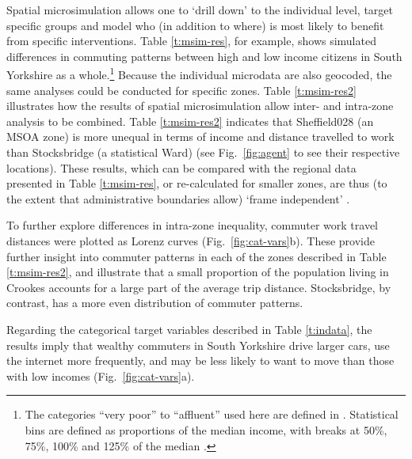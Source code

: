 \documentclass[a4paper, 11pt, twoside]{Thesis}
\begin{document}
Spatial microsimulation allows one to `drill down' to the individual
level, target specific groups and model who (in addition to where) is most
likely to benefit from specific interventions. Table \ref{t:msim-res}, for
example, shows simulated differences in commuting patterns between high
and low income citizens in South Yorkshire as a whole.\footnote{The categories
``very poor'' to ``affluent'' used here are defined in \citep{Ballas2005b}.
Statistical bins are defined as proportions of the median income, with
breaks at 50\%, 75\%, 100\% and 125\% of the median \citep[p.~91]{Ballas2005b}.}
Because the individual
microdata are also geocoded, the same analyses could be conducted for
specific zones.
Table \ref{t:msim-res2} illustrates how the results of spatial microsimulation
allow inter- and intra-zone analysis to be combined. Table \ref{t:msim-res2}
indicates that Sheffield028 (an MSOA zone) is more unequal in terms of
income and distance travelled to work than Stocksbridge (a statistical Ward)
(see Fig.~\ref{fig:agent} to see their respective locations).
These results, which can be compared with the regional data presented
in Table \ref{t:msim-res}, or re-calculated for smaller zones, are thus
(to the extent that administrative boundaries allow)
`frame independent' \citep{Horner2002}.

To further explore differences in intra-zone inequality,
commuter work travel distances were plotted as Lorenz curves
(Fig.~\ref{fig:cat-vars}b).
These provide further insight into commuter patterns in each of the zones
described in Table \ref{t:msim-res2}, and illustrate that a small proportion of
the population living in Crookes accounts for a large part of the average trip
distance. Stocksbridge, by contrast, has a more even distribution of commuter
patterns.

Regarding the categorical target variables described in Table \ref{t:indata},
the results imply that wealthy commuters in South Yorkshire drive larger cars,
use the internet more frequently, and may be less likely to want to move
than those with low incomes (Fig.~\ref{fig:cat-vars}a).
\end{document}
